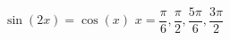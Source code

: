 { $\sin \left( 2x \right) = \cos \left( x \right)$}
{ $x = \dfrac{\pi}{6}, \dfrac{\pi}{2}, \dfrac{5\pi}{6}, \dfrac{3\pi}{2}$}
